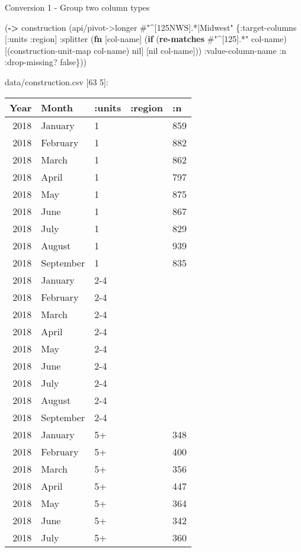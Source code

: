\documentclass[]{article}
\newenvironment{Shaded}{\begin{snugshade}}{\end{snugshade}}
\newcommand{\KeywordTok}[1]{\textcolor[rgb]{0.13,0.29,0.53}{\textbf{#1}}}
\newcommand{\SpecialStringTok}[1]{\textcolor[rgb]{0.31,0.60,0.02}{#1}}
\newcommand{\VariableTok}[1]{\textcolor[rgb]{0.00,0.00,0.00}{#1}}
\newcommand{\AttributeTok}[1]{\textcolor[rgb]{0.77,0.63,0.00}{#1}}
\newcommand{\NormalTok}[1]{#1}
\begin{document}
Conversion 1 - Group two column types

\begin{Shaded}
\begin{Highlighting}[]
\NormalTok{(}\KeywordTok{->}\NormalTok{ construction}
\NormalTok{    (api/pivot->longer }\SpecialStringTok{#"^[125NWS].*|Midwest"}\NormalTok{ \{}\AttributeTok{:target-columns}\NormalTok{ [}\AttributeTok{:units} \AttributeTok{:region}\NormalTok{]}
                                               \AttributeTok{:splitter}\NormalTok{ (}\KeywordTok{fn}\NormalTok{ [col-name]}
\NormalTok{                                                           (}\KeywordTok{if}\NormalTok{ (}\KeywordTok{re-matches} \SpecialStringTok{#"^[125].*"}\NormalTok{ col-name)}
\NormalTok{                                                             [(construction-unit-map col-name) }\VariableTok{nil}\NormalTok{]}
\NormalTok{                                                             [}\VariableTok{nil}\NormalTok{ col-name]))}
                                               \AttributeTok{:value-column-name} \AttributeTok{:n}
                                               \AttributeTok{:drop-missing}\NormalTok{? }\VariableTok{false}\NormalTok{\}))}
\end{Highlighting}
\end{Shaded}

data/construction.csv {[}63 5{]}:

\begin{longtable}[]{@{}rllll@{}}
\toprule
Year & Month & :units & :region & :n\tabularnewline
\midrule
\endhead
2018 & January & 1 & & 859\tabularnewline
2018 & February & 1 & & 882\tabularnewline
2018 & March & 1 & & 862\tabularnewline
2018 & April & 1 & & 797\tabularnewline
2018 & May & 1 & & 875\tabularnewline
2018 & June & 1 & & 867\tabularnewline
2018 & July & 1 & & 829\tabularnewline
2018 & August & 1 & & 939\tabularnewline
2018 & September & 1 & & 835\tabularnewline
2018 & January & 2-4 & &\tabularnewline
2018 & February & 2-4 & &\tabularnewline
2018 & March & 2-4 & &\tabularnewline
2018 & April & 2-4 & &\tabularnewline
2018 & May & 2-4 & &\tabularnewline
2018 & June & 2-4 & &\tabularnewline
2018 & July & 2-4 & &\tabularnewline
2018 & August & 2-4 & &\tabularnewline
2018 & September & 2-4 & &\tabularnewline
2018 & January & 5+ & & 348\tabularnewline
2018 & February & 5+ & & 400\tabularnewline
2018 & March & 5+ & & 356\tabularnewline
2018 & April & 5+ & & 447\tabularnewline
2018 & May & 5+ & & 364\tabularnewline
2018 & June & 5+ & & 342\tabularnewline
2018 & July & 5+ & & 360\tabularnewline
\bottomrule
\end{longtable}
\end{document}
